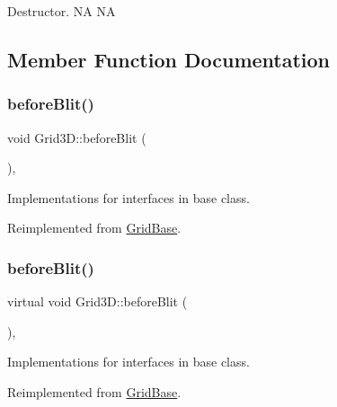 Destructor.  NA  NA 

\subsection{Member Function Documentation}
\mbox{\label{classGrid3D_a6f8b9946289014c187e645dd6de7974c}} 
\subsubsection{\texorpdfstring{before\+Blit()}{beforeBlit()}\hspace{0.1cm}{\footnotesize\ttfamily [1/2]}}
{\footnotesize\ttfamily void Grid3\+D\+::before\+Blit (\begin{DoxyParamCaption}{ }\end{DoxyParamCaption})\hspace{0.3cm}{\ttfamily [override]}, {\ttfamily [virtual]}}

Implementations for interfaces in base class. 

Reimplemented from \hyperlink{classGridBase_a04ceef221be29f561d00bd10ae7dc13a}{Grid\+Base}.

\mbox{\label{classGrid3D_a11850dd96447d34ae98b4d606177eee3}} 
\subsubsection{\texorpdfstring{before\+Blit()}{beforeBlit()}\hspace{0.1cm}{\footnotesize\ttfamily [2/2]}}
{\footnotesize\ttfamily virtual void Grid3\+D\+::before\+Blit (\begin{DoxyParamCaption}{ }\end{DoxyParamCaption})\hspace{0.3cm}{\ttfamily [override]}, {\ttfamily [virtual]}}

Implementations for interfaces in base class. 

Reimplemented from \hyperlink{classGridBase_a04ceef221be29f561d00bd10ae7dc13a}{Grid\+Base}.

\mbox{\label{classGrid3D_afbf54ef1bb003967ed93ec5c238716f0}} 
